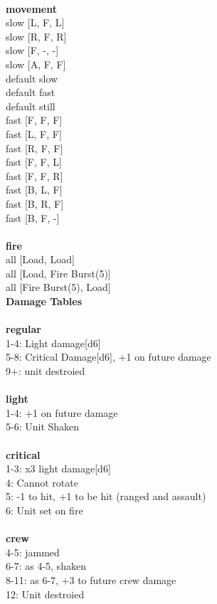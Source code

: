 \ \\ {\bf movement } \\
slow [L, F, L] \\
slow [R, F, R] \\
slow [F, -, -] \\
slow [A, F, F] \\
default slow \\
default fast \\
default still \\
fast [F, F, F] \\
fast [L, F, F] \\
fast [R, F, F] \\
fast [F, F, L] \\
fast [F, F, R] \\
fast [B, L, F] \\
fast [B, R, F] \\
fast [B, F, -] \\
\ \\ {\bf fire } \\
all [Load, Load] \\
all [Load, Fire Burst(5)] \\
all [Fire Burst(5), Load] \\


{\bf Damage Tables} \\
\ \\ {\bf regular } \\
1-4: Light damage[d6] \\
5-8: Critical Damage[d6], +1 on future damage \\
9+: unit destroied \\
\ \\ {\bf light } \\
1-4: +1 on future damage \\
5-6: Unit Shaken \\
\ \\ {\bf critical } \\
1-3: x3 light damage[d6] \\
4: Cannot rotate \\
5: -1 to hit, +1 to be hit (ranged and assault) \\
6: Unit set on fire \\
\ \\ {\bf crew } \\
4-5: jammed \\
6-7: as 4-5, shaken \\
8-11: as 6-7, +3 to future crew damage \\
12: Unit destroied \\











